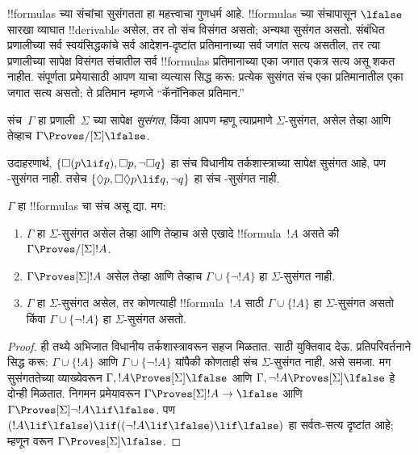 \documentclass[../../../include/open-logic-section]{subfiles}
\begin{document}


!!{formula}s च्या संचांचा सुसंगतता हा महत्त्वाचा
गुणधर्म आहे. !!{formula}s च्या संचापासून
$\lfalse$ सारखा व्याघात !!{derivable} असेल,
तर तो संच विसंगत असतो; अन्यथा सुसंगत असतो.
संबंधित प्रणालीच्या सर्व स्वयंसिद्धकांचे सर्व आदेशन-दृष्टांत
प्रतिमानाच्या सर्व जगांत सत्य असतील, तर त्या प्रणालीच्या सापेक्ष
विसंगत संचातील सर्व !!{formula}s प्रतिमानाच्या एका जगात
एकत्र सत्य असू शकत नाहीत. संपूर्णता प्रमेयासाठी आपण याचा
व्यत्यास सिद्ध करू: प्रत्येक सुसंगत संच
एका प्रतिमानातील एका जगात सत्य असतो; ते
प्रतिमान म्हणजे ``कॅनॉनिकल प्रतिमान.''

\begin{defn}
  संच~$\Gamma$ हा प्रणाली~$\Sigma$ च्या सापेक्ष
  \emph{सुसंगत}, किंवा आपण म्हणू त्याप्रमाणे
  $\Sigma$-सुसंगत, असेल तेव्हा आणि तेव्हाच
  $\Gamma \Proves/[\Sigma] \lfalse$.
\end{defn}

उदाहरणार्थ, $\{ \Box(p \lif q), \Box p, \lnot\Box q \}$
हा संच विधानीय तर्कशास्त्राच्या सापेक्ष सुसंगत आहे,
पण -सुसंगत नाही. तसेच
$\{ \Diamond p, \Box\Diamond
p \lif q, \lnot q \}$ हा संच -सुसंगत नाही.

\begin{prop}
  $\Gamma$ हा !!{formula}s चा संच असू द्या. मग:
  \begin{enumerate}
  \item $\Gamma$ हा $\Sigma$-सुसंगत असेल तेव्हा आणि
    तेव्हाच असे एखादे !!{formula}~$!A$ असते की
    $\Gamma \Proves/[\Sigma] !A$.
  \item {}%
    $\Gamma \Proves[\Sigma] !A$ असेल तेव्हा आणि
    तेव्हाच $\Gamma \cup \{
    \lnot!A \}$ हा $\Sigma$-सुसंगत नाही.
  \item {}%
    $\Gamma$ हा $\Sigma$-सुसंगत असेल, तर
    कोणत्याही !!{formula}~$!A$ साठी
    $\Gamma \cup \{ !A \}$ हा
    $\Sigma$-सुसंगत असतो किंवा
    $\Gamma \cup \{ \lnot!A \}$ हा
    $\Sigma$-सुसंगत असतो.
  \end{enumerate}
\end{prop}

\begin{proof}
  ही तथ्ये अभिजात विधानीय तर्कशास्त्रावरून सहज
  मिळतात.  साठी
  युक्तिवाद देऊ. प्रतिपरिवर्तनाने सिद्ध करू:
  $\Gamma \cup \{ !A \}$ आणि
  $\Gamma \cup \{ \lnot!A \}$ यांपैकी कोणताही
  संच $\Sigma$-सुसंगत नाही, असे समजा. मग
  सुसंगततेच्या व्याख्येवरून
  $\Gamma, !A \Proves[\Sigma]
  \lfalse$ आणि $\Gamma, \lnot !A \Proves[\Sigma] \lfalse$
  हे दोन्ही मिळतात. निगमन प्रमेयावरून
  $\Gamma \Proves[\Sigma] !A \to \lfalse$ आणि
  $\Gamma \Proves[\Sigma] \lnot!A \lif \lfalse$.
  पण $(!A \lif
  \lfalse) \lif ((\lnot!A \lif \lfalse) \lif \lfalse)$
  हा सर्वतः-सत्य दृष्टांत आहे; म्हणून
  वरून $\Gamma \Proves[\Sigma] \lfalse$.
\end{proof}
\end{document}
